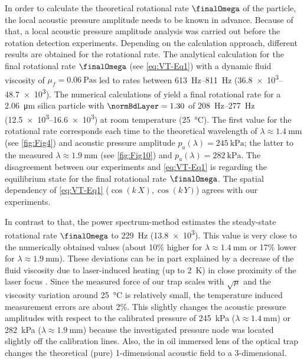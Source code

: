 In order to calculate the theoretical rotational rate $\finalOmega$ of the 
particle, the local acoustic pressure amplitude needs to be known in advance.  
Because of that, a local acoustic pressure amplitude analysis was carried out 
before the rotation detection experiments. Depending on the calculation 
approach, different results are obtained for the rotational rate. The analytical 
calculation for the final rotational rate $\finalOmega$ (see \cref{eq:VT-Eq1}) 
\cite{Lamprecht2015, Busse1981, Rudnick1977, Wang1989} with a dynamic fluid viscosity of 
$\mu_{f} = \SI{0.06}{\pascal\second}$ led to rates between 
\SIrange{613}{811}{\hertz} (\SIrange{36.8e3}{48.7e3}{\rpm}). The numerical 
calculations of \citeauthor{Hahn2016} \cite{Hahn2016} yield a final rotational 
rate for a \SI{2.06}{\micro\meter} silica particle with $\normBdLayer=1.30$ of 
\SIrange{208}{277}{\hertz} (\SIrange{12.5e3}{16.6e3}{\rpm}) at room temperature 
(\SI{25}{\celsius}).  The first value for the rotational rate corresponds each 
time to the theoretical wavelength of $\lambda \approx \SI{1.4}{\mm}$ (see 
\cref{fig:Fig4}) and acoustic pressure amplitude $p_{a}\left(\lambda\right) = 
\SI{245}{\kilo\pascal} $; the latter to the measured $\lambda \approx 
\SI{1.9}{\mm}$ (see \cref{fig:Fig10}) and $p_{a}\left(\lambda\right) = 
\SI{282}{\kilo\pascal} $. The disagreement between our experiments and 
\cref{eq:VT-Eq1} is regarding the equilibrium state for the final rotational rate 
$\finalOmega$. The spatial dependency of \cref{eq:VT-Eq1} ($\cos\left(k\,X\right), 
\cos\left( k\,Y \right)$) agrees with our experiments.

In contrast to that, the power spectrum-method estimates the steady-state 
rotational rate $\finalOmega$ to \SI{229}{\hertz} (\SI{13.8e3}{\rpm}). This 
value is very close to the numerically obtained values (about 10$\%$ higher for 
$\lambda \approx \SI{1.4}{\mm}$ or 17$\%$ lower for $\lambda \approx 
\SI{1.9}{\mm}$).  These deviations can be in part explained by a decrease of 
the fluid viscosity due to laser-induced heating (up to \SI{2}{\kelvin}) in 
close proximity of the laser focus \cite{Peterman2003}. Since the measured force 
of our trap scales with $\sqrt{\mu}$ and the viscosity variation around 
\SI{25}{\celsius} is relatively small, the temperature induced measurement 
errors are about 2\%.  This slightly changes the acoustic pressure amplitudes 
with respect to the calibrated pressure of \SI{245}{\kilo\pascal} ($\lambda 
\approx \SI{1.4}{\mm}$) or \SI{282}{\kilo\pascal} ($\lambda \approx 
\SI{1.9}{\mm}$) because the investigated pressure node was located slightly off 
the calibration lines.  Also, the in oil immersed lens of the optical trap 
changes the theoretical (pure) 1-dimensional acoustic field to a 3-dimensional.

